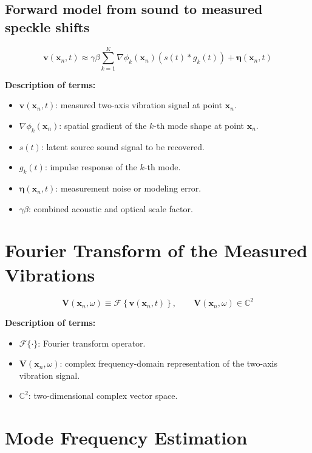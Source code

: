 \documentclass[11pt]{article}
\begin{document}
\subsection{Forward model from sound to measured speckle shifts}

\begin{equation}
\bm{v}(\bm{x}_n,t)
\approx
\gamma \beta
\sum_{k=1}^{K}
\nabla \phi_k(\bm{x}_n)
\left(
s(t) * g_k(t)
\right)
+
\bm{\eta}(\bm{x}_n,t)
\end{equation}

\textbf{Description of terms:}

\begin{itemize}
    \item $\bm{v}(\bm{x}_n,t)$: measured two-axis vibration signal at point $\bm{x}_n$.
    \item $\nabla \phi_k(\bm{x}_n)$: spatial gradient of the $k$-th mode shape at point $\bm{x}_n$.
    \item $s(t)$: latent source sound signal to be recovered.
    \item $g_k(t)$: impulse response of the $k$-th mode.
    \item $\bm{\eta}(\bm{x}_n,t)$: measurement noise or modeling error.
    \item $\gamma \beta$: combined acoustic and optical scale factor.
\end{itemize}

\section{Fourier Transform of the Measured Vibrations}

\begin{equation}
\bm{V}(\bm{x}_n,\omega)
\equiv
\mathcal{F}
\left\{
\bm{v}(\bm{x}_n,t)
\right\},
\qquad
\bm{V}(\bm{x}_n,\omega)
\in
\mathbb{C}^2
\end{equation}

\textbf{Description of terms:}

\begin{itemize}
    \item $\mathcal{F}\{\cdot\}$: Fourier transform operator.
    \item $\bm{V}(\bm{x}_n,\omega)$: complex frequency-domain representation of the two-axis vibration signal.
    \item $\mathbb{C}^2$: two-dimensional complex vector space.
\end{itemize}

\section{Mode Frequency Estimation}
\end{document}
